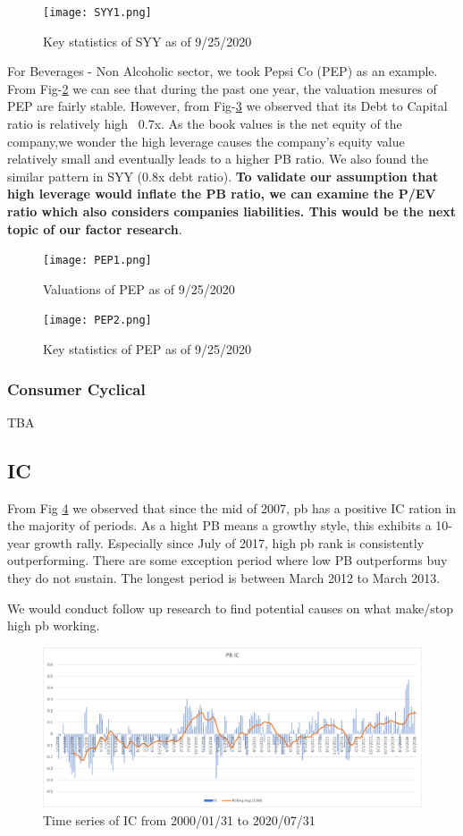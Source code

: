 \documentclass[11pt]{article} %
\begin{document}
\begin{figure}[H]
\centering
\texttt{[image: SYY1.png]}
\caption{Key statistics of SYY as of 9/25/2020}
\label{fig:syy1}
\end{figure}

For Beverages - Non Alcoholic sector, we took Pepsi Co (PEP) as an example. From Fig-\ref{fig:pep1} we can see that during the past one year, the valuation mesures of PEP are fairly stable. However, from Fig-\ref{fig:pep2} we observed that its Debt to Capital ratio is relatively high ~0.7x. As the book values is the net equity of the company,we wonder the high leverage causes the company's equity value relatively small and eventually leads to a higher PB ratio. We also found the similar pattern in SYY (0.8x debt ratio). \textbf{To validate our assumption that high leverage would inflate the PB ratio, we can examine the P/EV ratio which also considers companies liabilities. This would be the next topic of our factor research}.

\begin{figure}[H]
\centering
\texttt{[image: PEP1.png]}
\caption{Valuations of PEP as of 9/25/2020}
\label{fig:pep1}
\end{figure}

\begin{figure}[H]
\centering
\texttt{[image: PEP2.png]}
\caption{Key statistics of PEP as of 9/25/2020}
\label{fig:pep2}
\end{figure}


\subsubsection{Consumer Cyclical}
TBA

\subsection{IC}
From Fig \ref{fig:pb_ic_top} we observed that since the mid of 2007, pb has a positive IC ration in the majority of periods. As a hight PB means a growthy style, this exhibits a 10-year growth rally. Especially since July of 2017, high pb rank is consistently outperforming. There are some exception period where low PB outperforms buy they do not sustain. The longest period is between March 2012 to March 2013. 

We would conduct follow up research to find potential causes on what make/stop high pb working.

\begin{figure}[H]
	\centering
	\includegraphics[scale=0.5]{pb_ic_top.png}
	\caption{Time series of IC from 2000/01/31 to 2020/07/31}
	\label{fig:pb_ic_top}
\end{figure}
\end{document}
